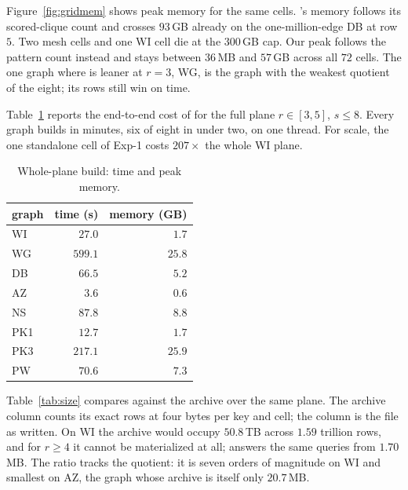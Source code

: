 Figure~\ref{fig:gridmem} shows peak memory for the same cells.
%
\cnd's memory follows its scored-clique count and crosses $93$\,GB already on the one-million-edge DB at row $5$.
%
Two mesh cells and one WI cell die at the $300$\,GB cap.
%
Our peak follows the pattern count instead and stays between $36$\,MB and $57$\,GB across all $72$ cells.
%
The one graph where \cnd{} is leaner at $r=3$, WG, is the graph with the weakest quotient of the eight; its rows still win on time.

Table~\ref{tab:plane} reports the end-to-end cost of \buildalg{} for the full plane $r\in[3,5]$, $s\le8$.
%
Every graph builds in minutes, six of eight in under two, on one thread.
%
For scale, the one standalone \cnd{} cell of Exp-1 costs $207\times$ the whole WI plane.

\begin{table}[t]
\centering
\caption{Whole-plane build: time and peak memory.}\label{tab:plane}
\small
\begin{tabular}{@{}lrr@{}}
\toprule
graph & time (s) & memory (GB)\\
\midrule
WI & $27.0$ & $1.7$\\
WG & $599.1$ & $25.8$\\
DB & $66.5$ & $5.2$\\
AZ & $3.6$ & $0.6$\\
NS & $87.8$ & $8.8$\\
PK1 & $12.7$ & $1.7$\\
PK3 & $217.1$ & $25.9$\\
PW & $70.6$ & $7.3$\\
\bottomrule
\end{tabular}
\end{table}

Table~\ref{tab:size} compares \nsi{} against the archive over the same plane.
%
The archive column counts its exact rows at four bytes per key and cell; the \nsi{} column is the file as written.
%
On WI the archive would occupy $50.8$\,TB across $1.59$ trillion rows, and for $r\ge4$ it cannot be materialized at all; \nsi{} answers the same queries from $1.70$\,MB.
%
The ratio tracks the quotient: it is seven orders of magnitude on WI and smallest on AZ, the graph whose archive is itself only $20.7$\,MB.

